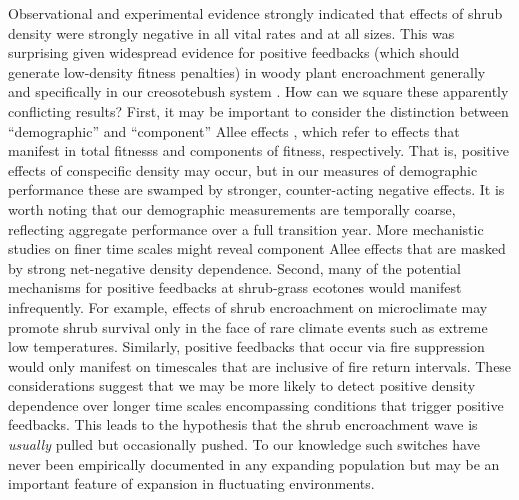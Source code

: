 \documentclass[11pt]{article}\usepackage[]{graphicx}\usepackage[]{color}
\begin{document}
Observational and experimental evidence strongly indicated that effects of shrub density were strongly negative in all vital rates and at all sizes.
This was surprising given widespread evidence for positive feedbacks (which should generate low-density fitness penalties) in woody plant encroachment generally \citep{d2013vegetation} and specifically in our creosotebush system \citep{d2010positive}. 
How can we square these apparently conflicting results?
First, it may be important to consider the distinction between ``demographic'' and ``component'' Allee effects \citep{stephens1999allee}, which refer to effects that manifest in total fitnesss and components of fitness, respectively. 
That is, positive effects of conspecific density may occur, but in our measures of demographic performance these are swamped by stronger, counter-acting negative effects.
It is worth noting that our demographic measurements are temporally coarse, reflecting aggregate performance over a full transition year.
More mechanistic studies on finer time scales might reveal component Allee effects that are masked by strong net-negative density dependence. 
Second, many of the potential mechanisms for positive feedbacks at shrub-grass ecotones would manifest infrequently. 
For example, effects of shrub encroachment on microclimate \citep{d2013vegetation} may promote shrub survival only in the face of rare climate events such as extreme low temperatures.
Similarly, positive feedbacks that occur via fire suppression \citep{ratajczak2011positive,collins2021fire} would only manifest on timescales that are inclusive of fire return intervals. 
These considerations suggest that we may be more likely to detect positive density dependence over longer time scales encompassing conditions that trigger positive feedbacks. 
This leads to the hypothesis that the shrub encroachment wave is \emph{usually} pulled but occasionally pushed.
To our knowledge such switches have never been empirically documented in any expanding population but may be an important feature of expansion in fluctuating environments. 
\end{document}
